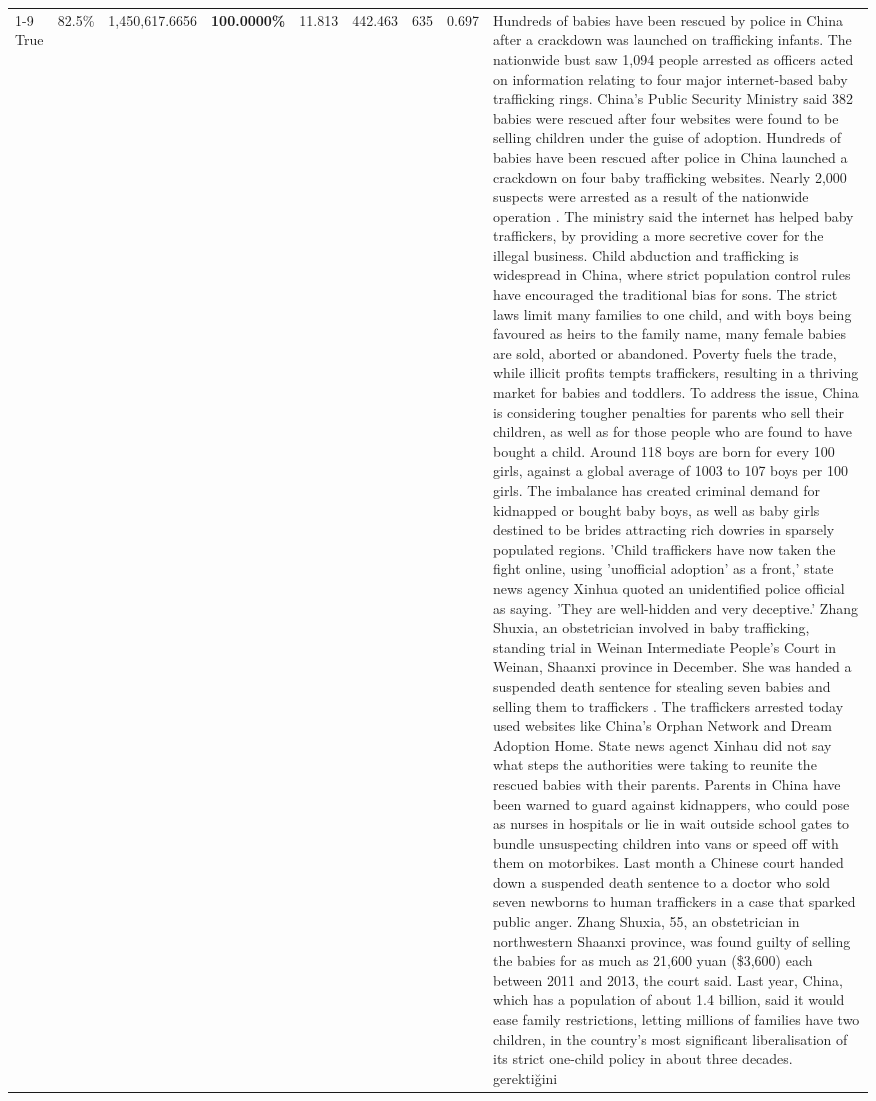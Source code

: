 \begin{table}[H]
\begin{tabular}{lllrlllll}
\cline{1-9}
True & 82.5\% & 1,450,617.6656 & \bfseries \color{red} 100.0000\% & 11.813 & 442.463 & 635 & 0.697 & Hundreds of babies have been rescued by police in China after a crackdown was launched on trafficking infants. The nationwide bust saw 1,094 people arrested as officers acted on information relating to four major internet-based baby trafficking rings. China's Public Security Ministry said 382 babies were rescued after four websites were found to be selling children under the guise of adoption. Hundreds of babies have been rescued after police in China launched a crackdown on four baby trafficking websites. Nearly 2,000 suspects were arrested as a result of the nationwide operation . The ministry said the internet has helped baby traffickers, by providing a more secretive cover for the illegal business. Child abduction and trafficking is widespread in China, where strict population control rules have encouraged the traditional bias for sons. The strict laws limit many families to one child, and with boys being favoured as heirs to the family name, many female babies are sold, aborted or abandoned. Poverty fuels the trade, while illicit profits tempts traffickers, resulting in a thriving market for babies and toddlers. To address the issue, China is considering tougher penalties for parents who sell their children, as well as for those people who are found to have bought a child. Around 118 boys are born for every 100 girls, against a global average of 1003 to 107 boys per 100 girls. The imbalance has created criminal demand for kidnapped or bought baby boys, as well as baby girls destined to be brides attracting rich dowries in sparsely populated regions. 'Child traffickers have now taken the fight online, using 'unofficial adoption' as a front,' state news agency Xinhua quoted an unidentified police official as saying. 'They are well-hidden and very deceptive.' Zhang Shuxia, an obstetrician involved in baby trafficking, standing trial in Weinan Intermediate People's Court in Weinan, Shaanxi province in December. She was handed a suspended death sentence for stealing seven babies and selling them to traffickers . The traffickers arrested today used websites like China's Orphan Network and Dream Adoption Home. State news agenct Xinhau did not say what steps the authorities were taking to reunite the rescued babies with their parents. Parents in China have been warned to guard against kidnappers, who could pose as nurses in hospitals or lie in wait outside school gates to bundle unsuspecting children into vans or speed off with them on motorbikes. Last month a Chinese court handed down a suspended death sentence to a doctor who sold seven newborns to human traffickers in a case that sparked public anger. Zhang Shuxia, 55, an obstetrician in northwestern Shaanxi province, was found guilty of selling the babies for as much as 21,600 yuan (\$3,600) each between 2011 and 2013, the court said. Last year, China, which has a population of about 1.4 billion, said it would ease family restrictions, letting millions of families have two children, in the country's most significant liberalisation of its strict one-child policy in about three decades. gerektiğini \\

\end{tabular}
\end{table}
